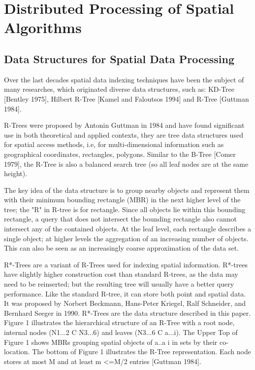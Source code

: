 \section{Distributed Processing of Spatial Algorithms}

\subsection{Data Structures for Spatial Data Processing}

	Over the last decades spatial data indexing techniques have been the subject of many researches, which originated diverse data structures, such as: KD-Tree [Bentley 1975], Hilbert R-Tree [Kamel and Faloutsos 1994] and R-Tree [Guttman 1984].
	
	R-Trees were proposed by Antonin Guttman in 1984 and have found significant use in both theoretical and applied contexts, they are tree data structures used for spatial access methods, i.e, for multi-dimensional information such as geographical coordinates, rectangles, polygons. Similar to the B-Tree [Comer 1979], the R-Tree is also a balanced search tree (so all leaf nodes are at the same height).

	The key idea of the data structure is to group nearby objects and represent them with their minimum bounding rectangle (MBR) in the next higher level of the tree; the "R" in R-tree is for rectangle. Since all objects lie within this bounding rectangle, a query that does not intersect the bounding rectangle also cannot intersect any of the contained objects. At the leaf level, each rectangle describes a single object; at higher levels the aggregation of an increasing number of objects. This can also be seen as an increasingly coarse approximation of the data set.
	
	R*-Trees are a variant of R-Trees used for indexing spatial information. R*-trees have slightly higher construction cost than standard R-trees, as the data may need to be reinserted; but the resulting tree will usually have a better query performance. Like the standard R-tree, it can store both point and spatial data. It was proposed by Norbert Beckmann, Hans-Peter Kriegel, Ralf Schneider, and Bernhard Seeger in 1990. R*-Trees are the data structure described in this paper.
Figure 1 illustrates the hierarchical structure of an R-Tree with a root node, internal nodes (N1...2 C N3...6) and leaves (N3...6 C a...i). The Upper Top of Figure 1 shows MBRs grouping spatial objects of a..a i in sets by their co-location. The bottom of Figure 1 illustrates the R-Tree representation. Each node stores at most M and at least m <=M/2 entries [Guttman 1984].

